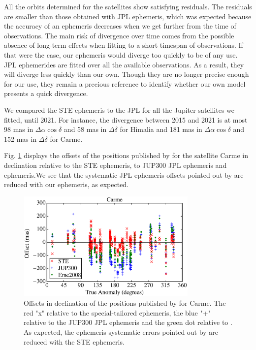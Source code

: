\documentclass[useAMS,usenatbib]{mn2e}
\begin{document}
All the orbits determined for the satellites show satisfying residuals. The residuals are smaller than those obtained with JPL ephemeris, which was expected because the accuracy of an ephemeris decreases when we get further from the time of observations. The main risk of divergence over time comes from the possible absence of long-term effects when fitting to a short timespan of observations. If that were the case, our ephemeris would diverge too quickly to be of any use. JPL ephemerides are fitted over all the available observations. As a result, they will diverge less quickly than our own. Though they are no longer precise enough for our use, they remain a precious reference to identify whether our own model presents a quick divergence.

We compared the STE ephemeris to the JPL for all the Jupiter satellites we fitted, until 2021. For instance, the divergence between 2015 and 2021 is at most 98 mas in $\Delta \alpha \cos \delta$ and 58 mas in $\Delta \delta$ for Himalia and 181 mas in $\Delta \alpha \cos \delta$ and 152 mas in $\Delta \delta$ for Carme.

Fig. \ref{Fig: JPL-STE} displays the offsets of the positions published by \cite{GomesJunior2015} for the satellite Carme in declination relative to the STE ephemeris, to \cite{Jacobson2012} JUP300 JPL ephemeris and \cite{Emelyanov2008} ephemeris.We see that the systematic JPL ephemeris offsets pointed out by \cite{GomesJunior2015} are reduced with our ephemeris, as expected.

\begin{figure}
\includegraphics[width=8.8cm]{figures/Carme_ephemeris.eps}
\caption{Offsets in declination of the positions published by \protect\cite{GomesJunior2015} for Carme. The red "x" relative to the special-tailored ephemeris, the blue "+" relative to the JUP300 JPL ephemeris and the green dot relative to \protect\cite{Emelyanov2008}. As expected, the ephemeris systematic errors pointed out by \protect\cite{GomesJunior2015} are reduced with the STE ephemeris. \label{Fig: JPL-STE}}
\end{figure}
\end{document}

